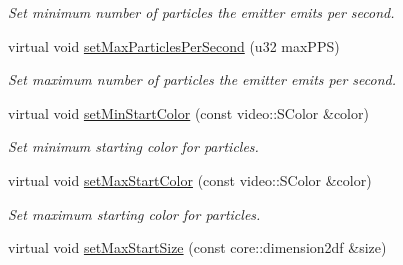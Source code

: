 \begin{DoxyCompactItemize}
\begin{DoxyCompactList}\small\item\em Set minimum number of particles the emitter emits per second. \end{DoxyCompactList}\item 
\hypertarget{classirr_1_1scene_1_1_c_particle_ring_emitter_abdfd49debbf1b46ddd5ad717ce98ad14}{virtual void \hyperlink{classirr_1_1scene_1_1_c_particle_ring_emitter_abdfd49debbf1b46ddd5ad717ce98ad14}{set\-Max\-Particles\-Per\-Second} (u32 max\-P\-P\-S)}\label{classirr_1_1scene_1_1_c_particle_ring_emitter_abdfd49debbf1b46ddd5ad717ce98ad14}

\begin{DoxyCompactList}\small\item\em Set maximum number of particles the emitter emits per second. \end{DoxyCompactList}\item 
\hypertarget{classirr_1_1scene_1_1_c_particle_ring_emitter_af3c992453848d70bdd3c227ba5784f71}{virtual void \hyperlink{classirr_1_1scene_1_1_c_particle_ring_emitter_af3c992453848d70bdd3c227ba5784f71}{set\-Min\-Start\-Color} (const video\-::\-S\-Color \&color)}\label{classirr_1_1scene_1_1_c_particle_ring_emitter_af3c992453848d70bdd3c227ba5784f71}

\begin{DoxyCompactList}\small\item\em Set minimum starting color for particles. \end{DoxyCompactList}\item 
\hypertarget{classirr_1_1scene_1_1_c_particle_ring_emitter_a1318dd79cc1e98b3023d080ed8d5cf55}{virtual void \hyperlink{classirr_1_1scene_1_1_c_particle_ring_emitter_a1318dd79cc1e98b3023d080ed8d5cf55}{set\-Max\-Start\-Color} (const video\-::\-S\-Color \&color)}\label{classirr_1_1scene_1_1_c_particle_ring_emitter_a1318dd79cc1e98b3023d080ed8d5cf55}

\begin{DoxyCompactList}\small\item\em Set maximum starting color for particles. \end{DoxyCompactList}\item 
\hypertarget{classirr_1_1scene_1_1_c_particle_ring_emitter_a8012272d85908f5603d80db3273219ce}{virtual void \hyperlink{classirr_1_1scene_1_1_c_particle_ring_emitter_a8012272d85908f5603d80db3273219ce}{set\-Max\-Start\-Size} (const core\-::dimension2df \&size)}\label{classirr_1_1scene_1_1_c_particle_ring_emitter_a8012272d85908f5603d80db3273219ce}


\end{DoxyCompactItemize}
